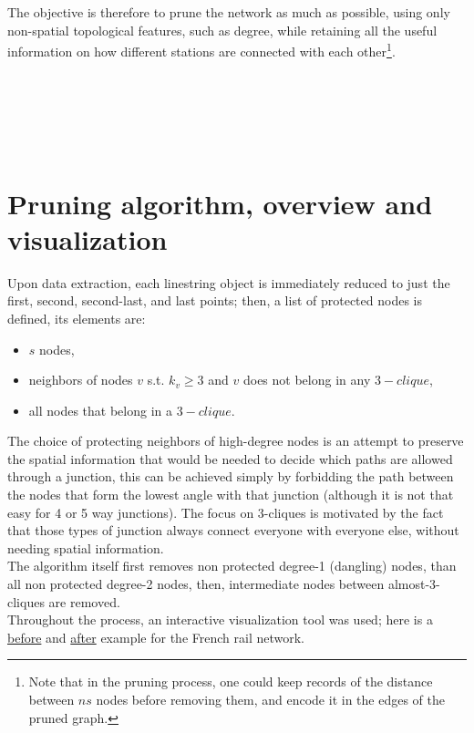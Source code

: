 The objective is therefore to prune the network as much as possible, using only non-spatial topological features, such as degree, while retaining all the useful information on how different stations are connected with each other\footnote{Note that in the pruning process, one could keep records of the distance between $ns$ nodes before removing them, and encode it in the edges of the pruned graph.}.
\\
\\
\\
\\
\\
\\

\section{Pruning algorithm, overview and visualization}
Upon data extraction, each linestring object is immediately reduced to just the first, second, second-last, and last points; then, a list of protected nodes is defined, its elements are:
\begin{itemize}
  \item $s$ nodes,
  \item neighbors of nodes $v$ s.t. $k_v \geq 3$ and $v$ does not belong in any $3-clique$, 
  \item all nodes that belong in a $3-clique$.
\end{itemize}
The choice of protecting neighbors of high-degree nodes is an attempt to preserve the spatial information that would be needed to decide which paths are allowed through a junction, this can be achieved simply by forbidding the path between the nodes that form the lowest angle with that junction (although it is not that easy for 4 or 5 way junctions). The focus on 3-cliques is motivated by the fact that those types of junction always connect everyone with everyone else, without needing spatial information.\\
The algorithm itself first removes non protected degree-1 (dangling) nodes, than all non protected degree-2 nodes, then, intermediate nodes between almost-3-cliques are removed. \\
Throughout the process, an interactive visualization tool was used; here is a 
\href{https://ale-neri-137.github.io/PoCN_project/french_rail_before.html}{before} and 
\href{https://ale-neri-137.github.io/PoCN_project/french_rail_after.html}{after} example for the French rail network.

 




\newpage
